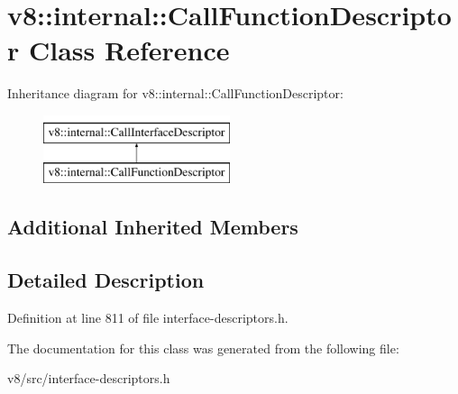 \hypertarget{classv8_1_1internal_1_1CallFunctionDescriptor}{}\section{v8\+:\+:internal\+:\+:Call\+Function\+Descriptor Class Reference}
\label{classv8_1_1internal_1_1CallFunctionDescriptor}
Inheritance diagram for v8\+:\+:internal\+:\+:Call\+Function\+Descriptor\+:\begin{figure}[H]
\begin{center}
\leavevmode
\includegraphics[height=2.000000cm]{classv8_1_1internal_1_1CallFunctionDescriptor}
\end{center}
\end{figure}
\subsection*{Additional Inherited Members}


\subsection{Detailed Description}


Definition at line 811 of file interface-\/descriptors.\+h.



The documentation for this class was generated from the following file\+:\begin{DoxyCompactItemize}
\item 
v8/src/interface-\/descriptors.\+h\end{DoxyCompactItemize}
